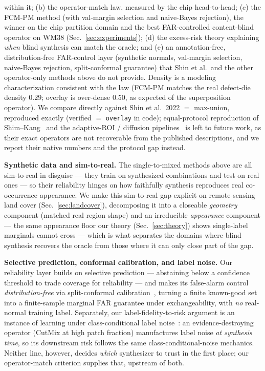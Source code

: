 \documentclass[11pt]{article}
\begin{document}
within it; (b) the operator-match law, measured by the chip head-to-head; (c) the
FCM-PM method (with val-margin selection and naive-Bayes rejection), the winner on the
chip partition domain and the best FAR-controlled content-blind operator on WM38
(Sec.~\ref{sec:experiments}); (d) the excess-risk theory explaining \emph{when} blind
synthesis can match the oracle; and (e) an annotation-free, distribution-free
FAR-control layer (synthetic normals, val-margin selection, naive-Bayes rejection,
split-conformal guarantee) that Shin et al.\ and the other operator-only methods above
do not provide. Density is a modeling characterization consistent with the law (FCM-PM
matches the real defect-die density $0.29$; overlay is over-dense $0.50$, as expected
of the superposition operator). We compare directly against Shin et al.\ 2022 $=$
max-union, reproduced exactly (verified $=$ \texttt{overlay} in code); equal-protocol
reproduction of Shim--Kang~\cite{eswa2023singletomixed} and the adaptive-ROI /
diffusion pipelines~\cite{thuan2025adaptive,li2025separation,yang2026diffusion} is left
to future work, as their exact operators are not recoverable from the published
descriptions, and we report their native numbers and the protocol gap instead.

\textbf{Synthetic data and sim-to-real.} The single-to-mixed methods above are all
sim-to-real in disguise --- they train on synthesized combinations and test on real
ones --- so their reliability hinges on how faithfully synthesis reproduces real
co-occurrence appearance. We make this sim-to-real gap explicit on remote-sensing land
cover (Sec.~\ref{sec:landcover}), decomposing it into a closeable \emph{geometry}
component (matched real region shape) and an irreducible \emph{appearance} component ---
the same appearance floor our theory (Sec.~\ref{sec:theory}) shows single-label
marginals cannot cross --- which is what separates the domains where blind synthesis
recovers the oracle from those where it can only close part of the gap.

\textbf{Selective prediction, conformal calibration, and label noise.} Our reliability
layer builds on selective prediction --- abstaining below a confidence threshold to
trade coverage for reliability --- and makes its false-alarm control
\emph{distribution-free} via split-conformal calibration~\cite{lei2018conformal},
turning a finite known-good set into a finite-sample marginal FAR guarantee under
exchangeability, with \emph{no} real-normal training label. Separately, our
label-fidelity-to-risk argument is an instance of learning under class-conditional label
noise~\cite{natarajan2013noisy}: an evidence-destroying operator (CutMix at high patch
fraction) manufactures label noise \emph{at synthesis time}, so its downstream risk
follows the same class-conditional-noise mechanics. Neither line, however, decides
\emph{which} synthesizer to trust in the first place; our operator-match criterion
supplies that, upstream of both.
\end{document}
